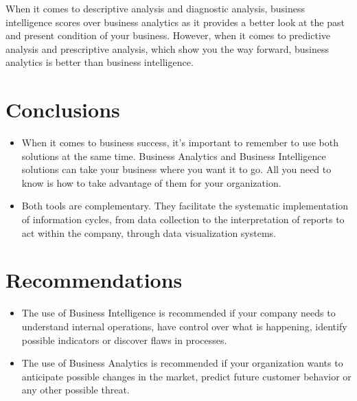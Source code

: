\documentclass{article}
\begin{document}
\begin{multicols}{2}
When it comes to descriptive analysis and diagnostic analysis, business intelligence scores over business analytics as it provides a better look at the past and present condition of your business. However, when it comes to predictive analysis and prescriptive analysis, which show you the way forward, business analytics is better than business intelligence.


\section{Conclusions}
\begin{itemize}
    \item When it comes to business success, it's important to remember to use both solutions at the same time. Business Analytics and Business Intelligence solutions can take your business where you want it to go. All you need to know is how to take advantage of them for your organization.
    
    \item Both tools are complementary. They facilitate the systematic implementation of information cycles, from data collection to the interpretation of reports to act within the company, through data visualization systems.
    
\end{itemize}
 

\section{Recommendations}
\begin{itemize}
    \item The use of Business Intelligence is recommended if your company needs to understand internal operations, have control over what is happening, identify possible indicators or discover flaws in processes.
    
    \item The use of Business Analytics is recommended if your organization wants to anticipate possible changes in the market, predict future customer behavior or any other possible threat.
    
\end{itemize}
\end{multicols}
\newpage
\end{document}
